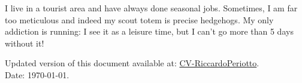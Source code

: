 \documentclass[11 pt,oneside,a4paper,titlepage]{article}
\begin{document}
{\begin{minipage}{11.3cm}
        

        I live in a tourist area and have always done seasonal jobs. Sometimes, I am far too meticulous and indeed my scout totem is precise hedgehogs. My only addiction is running: I see it as a leisure time, but I can't go more than 5 days without it!
        
        \vspace*{0.22cm}
        Updated version of this document available at: \href{https://riccardoperiotto.github.io/CurriculumVitae/CV-RiccardoPeriotto.pdf}{CV-RiccardoPeriotto}. \\
        Date: \today.
    \end{minipage}} %
\end{document}
